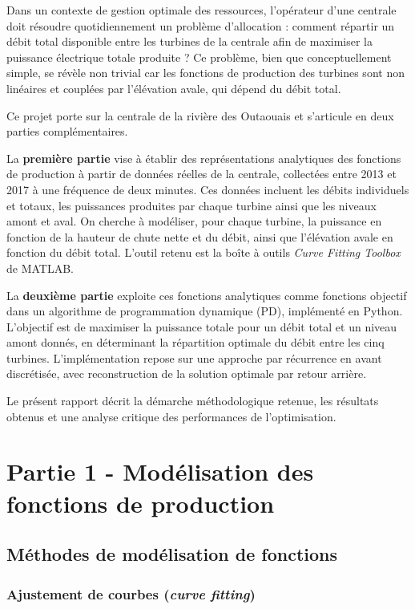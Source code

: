 \documentclass[12pt, letterpaper]{report}
\begin{document}
Dans un contexte de gestion optimale des ressources, l'opérateur d'une centrale doit résoudre quotidiennement un problème d'allocation : comment répartir un débit total disponible entre les turbines de la centrale afin de maximiser la puissance électrique totale produite ? Ce problème, bien que conceptuellement simple, se révèle non trivial car les fonctions de production des turbines sont non linéaires et couplées par l'élévation avale, qui dépend du débit total.

Ce projet porte sur la centrale de la rivière des Outaouais et s'articule en deux parties complémentaires.

La \textbf{première partie} vise à établir des représentations analytiques des fonctions de production à partir de données réelles de la centrale, collectées entre 2013 et 2017 à une fréquence de deux minutes. Ces données incluent les débits individuels et totaux, les puissances produites par chaque turbine ainsi que les niveaux amont et aval. On cherche à modéliser, pour chaque turbine, la puissance en fonction de la hauteur de chute nette et du débit, ainsi que l'élévation avale en fonction du débit total. L'outil retenu est la boîte à outils \textit{Curve Fitting Toolbox} de MATLAB.

La \textbf{deuxième partie} exploite ces fonctions analytiques comme fonctions objectif dans un algorithme de programmation dynamique (PD), implémenté en Python. L'objectif est de maximiser la puissance totale pour un débit total et un niveau amont donnés, en déterminant la répartition optimale du débit entre les cinq turbines. L'implémentation repose sur une approche par récurrence en avant discrétisée, avec reconstruction de la solution optimale par retour arrière.

Le présent rapport décrit la démarche méthodologique retenue, les résultats obtenus et une analyse critique des performances de l'optimisation.

\part{Partie 1 - Modélisation des fonctions de production}

\chapter{Méthodes de modélisation de fonctions}

\section{Ajustement de courbes (\textit{curve fitting})}
\end{document}
